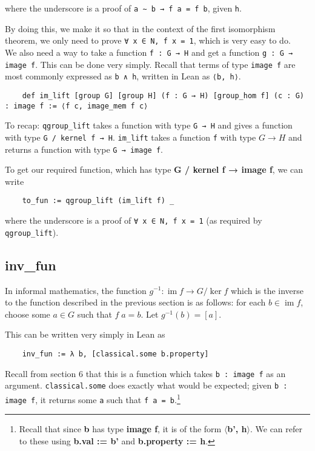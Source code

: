\documentclass[runningheads,a4paper]{llncs}
\DeclareMathOperator{\im}{im}
\renewcommand{\-}{\setminus}
\begin{document}
where the underscore is a proof of \lstinline{a ∼ b → f a = f b}, given \lstinline{h}.

By doing this, we make it so that in the context of the first isomorphism theorem, we only need to prove \lstinline{∀ x ∈ N, f x = 1}, which is very easy to do.\\

We also need a way to take a function \lstinline{f : G → H} and get a function \lstinline{g : G → image f}. This can be done very simply. Recall that terms of type \lstinline{image f} are most commonly expressed as \lstinline{b ∧ h}, written in Lean as \lstinline{⟨b, h⟩}.

\begin{lstlisting}
    def im_lift [group G] [group H] (f : G → H) [group_hom f] (c : G) : image f := ⟨f c, image_mem f c⟩
\end{lstlisting}

To recap: \lstinline{qgroup_lift} takes a function with type \lstinline{G → H} and gives a function with type \lstinline{G / kernel f → H}. \lstinline{im_lift} takes a function \lstinline{f} with type $G → H$ and returns a function with type \lstinline{G → image f}.

To get our required function, which has type \textbf{G / kernel f → image f}, we can write

\begin{lstlisting}
    to_fun := qgroup_lift (im_lift f) _
\end{lstlisting}

where the underscore is a proof of \lstinline{∀ x ∈ N, f x = 1} (as required by \lstinline{qgroup_lift}).

\subsection{inv\_fun}

In informal mathematics, the function $g^{-1} : \im f \to G / \ker f$ which is the inverse to the function described in the previous section is as follows: for each $b \in \im f$, choose some $a \in G$ such that $f\; a = b$. Let $g^{-1} (b) = [a]$.

This can be written very simply in Lean as 

\begin{lstlisting}
    inv_fun := λ b, [classical.some b.property]
\end{lstlisting}

Recall from section 6 that this is a function which takes \lstinline{b : image f} as an argument. \lstinline{classical.some} does exactly what would be expected; given \lstinline{b : image f}, it returns some \lstinline{a} such that \lstinline{f a = b}.\footnote{Recall that since \textbf{b} has type \textbf{image f}, it is of the form \textbf{$\langle$b', h$\rangle$}. We can refer to these using \textbf{b.val := b'} and \textbf{b.property := h}.}
\end{document}

